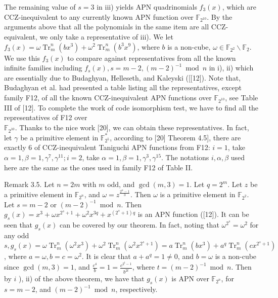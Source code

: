 \documentclass[10pt]{article}
\begin{document}
The remaining value of $s=3$ in iii) yields APN quadrinomials $f_{3}(x)$, which are CCZ-inequivalent to any currently known APN function over $\mathbb{F}_{2^{10}}$. By the arguments above that all the polynomials in the same item are all CCZ-equivalent, we only take a representative of iii). We let $f_{3}(x)=\omega \operatorname{Tr}_{m}^{n}\left(b x^{3}\right)+\omega^{2} \operatorname{Tr}_{m}^{n}\left(b^{3} x^{9}\right)$, where $b$ is a non-cube, $\omega \in \mathbb{F}_{2^{2}} \backslash \mathbb{F}_{2}$. We use this $f_{3}(x)$ to compare against representatives from all the known infinite families including $f_{s}(x), s=m-2,(m-2)^{-1} \bmod n$ in i), ii) which are essentially due to Budaghyan, Helleseth, and Kaleyski ([[12]). Note that, Budaghyan et al. had presented a table listing all the representatives, except family F12, of all the known CCZ-inequivalent APN functions over $\mathbb{F}_{2^{10}}$, see Table III of [12]. To complete the work of code isomorphism test, we have to find all the representatives of F12 over\\
$\mathbb{F}_{2^{10}}$. Thanks to the nice work [20], we can obtain these representatives. In fact, let $\gamma$ be a primitive element in $\mathbb{F}_{2^{5}}^{*}$, according to [20] Theorem 4.5], there are exactly 6 of CCZ-inequivalent Taniguchi APN functions from F12: $i=1$, take $\alpha=1, \beta=1, \gamma^{7}, \gamma^{11} ; i=2$, take $\alpha=1, \beta=1, \gamma^{3}, \gamma^{15}$. The notations $i, \alpha, \beta$ used here are the same as the ones used in family F12 of Table II.

Remark 3.5. Let $n=2 m$ with $m$ odd, and $\operatorname{gcd}(m, 3)=1$. Let $q=2^{m}$. Let $z$ be a primitive element in $\mathbb{F}_{2^{n}}$, and $\omega=z^{\frac{2^{n}-1}{3}}$. Then $\omega$ is a primitive element in $\mathbb{F}_{2^{2}}$. Let $s=m-2$ or $(m-2)^{-1} \bmod n$. Then $g_{s}(x)=x^{3}+\omega x^{2^{s}+1}+\omega^{2} x^{3 q}+x^{\left(2^{s}+1\right) q}$ is an APN function ([12]). It can be seen that $g_{s}(x)$ can be covered by our theorem. In fact, noting that $\omega^{2^{s}}=\omega^{2}$ for any odd $s, g_{s}(x)=\omega \operatorname{Tr}_{m}^{n}\left(\omega^{2} x^{3}\right)+\omega^{2} \operatorname{Tr}_{m}^{n}\left(\omega^{2} x^{2^{s}+1}\right)= a \operatorname{Tr}_{m}^{n}\left(b x^{3}\right)+a^{q} \operatorname{Tr}_{m}^{n}\left(c x^{2^{s}+1}\right)$, where $a=\omega, b=c=\omega^{2}$. It is clear that $a+a^{q}=1 \neq 0$, and $b=\omega$ is a non-cube since $\operatorname{gcd}(m, 3)=1$, and $\frac{c^{4}}{b}=1=\frac{c^{2^{t}-1}}{b^{2 t}}$, where $t=(m-2)^{-1} \bmod n$. Then by $i$ ), ii) of the above theorem, we have that $g_{s}(x)$ is APN over $\mathbb{F}_{2^{n}}$, for $s=m-2$, and $(m-2)^{-1} \bmod n$, respectively.
\end{document}
